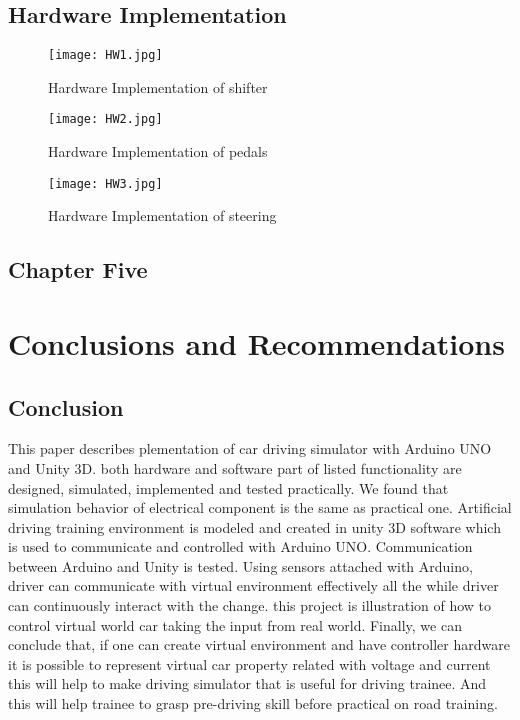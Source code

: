 \documentclass[12pt,a4paper]{article}
\begin{document}
\begin{center}
\begin{center}
\begin{center}
\begin{itemize}
\subsection{Hardware Implementation}

\begin{figure}[H]
	\centering 
	\texttt{[image: HW1.jpg]}
	\caption{ Hardware Implementation of shifter}	
\end{figure}
\begin{figure}[H]
\centering 
\texttt{[image: HW2.jpg]}
\caption{Hardware Implementation of pedals}	
\end{figure}
\begin{figure}[H]
\centering 
\texttt{[image: HW3.jpg]}
\caption{Hardware Implementation of steering}	
\end{figure}
\newpage
\begin{center}
\section*{Chapter Five}
\end{center}
\section{Conclusions and Recommendations}
\subsection{Conclusion}
This paper describes 
plementation of car driving simulator with Arduino UNO and Unity 3D. both hardware and software part of listed functionality are designed, simulated, implemented and tested practically. We found that simulation behavior of electrical component is the same as practical one. Artificial driving training environment is modeled and created in unity 3D software which is used to communicate and controlled with Arduino UNO. Communication between Arduino and Unity is tested. Using sensors attached with Arduino, driver can communicate with virtual environment effectively all the while driver can continuously interact with the change. this project is illustration of how to control virtual world car taking the input from real world. Finally, we can conclude that, if one can create virtual environment and have controller hardware it is possible to represent virtual car property related with voltage and current this will help to make driving simulator that is useful for driving trainee. And this will help trainee to grasp pre-driving skill before practical on road training.

\end{itemize}
\end{center}
\end{center}
\end{center}
\end{document}
